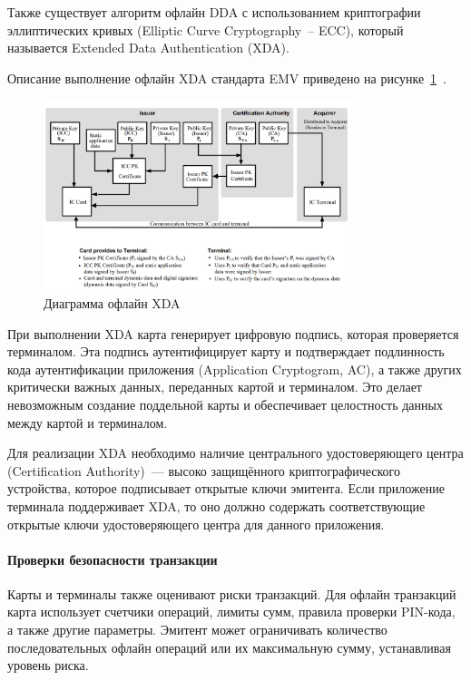 Также существует алгоритм офлайн DDA с использованием криптографии эллиптических кривых (Elliptic Curve Cryptography~-- ECC), который называется
Extended Data Authentication (XDA).

Описание выполнение офлайн XDA стандарта EMV приведено на рисунке~\ref{fig:emv_offline_xda}~\cite{emv_book_2}.

\begin{figure}[H]
    \centering
    \includegraphics[width=0.8\textwidth]{images/research/emv_offline_xda}
    \caption{\centering Диаграмма офлайн XDA}
    \label{fig:emv_offline_xda}
\end{figure}


При выполнении XDA карта генерирует цифровую подпись, которая проверяется терминалом.
Эта подпись аутентифицирует карту и подтверждает подлинность кода аутентификации приложения (Application Cryptogram, AC), а также других критически важных данных, переданных картой и терминалом.
Это делает невозможным создание поддельной карты и обеспечивает целостность данных между картой и терминалом.

Для реализации XDA необходимо наличие центрального удостоверяющего центра (Certification Authority)~--- высоко защищённого криптографического устройства, которое подписывает открытые ключи эмитента.
Если приложение терминала поддерживает XDA, то оно должно содержать соответствующие открытые ключи удостоверяющего центра для данного приложения.

\paragraph{Проверки безопасности транзакции}

Карты и терминалы также оценивают риски транзакций.
Для офлайн транзакций карта использует счетчики операций, лимиты сумм, правила проверки PIN-кода, а также другие параметры.
Эмитент может ограничивать количество последовательных офлайн операций или их максимальную сумму, устанавливая уровень риска.

